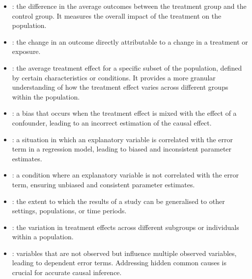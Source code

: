 \documentclass[letterpaper,10pt,english]{jupyterBook}
\begin{document}
\label{\detokenize{notebooks/glossary:effects-and-estimates}}\begin{itemize}
\item {} 
\sphinxAtStartPar
{}: the difference in the average outcomes between the treatment group and the control group. It measures the overall impact of the treatment on the population.

\item {} 
\sphinxAtStartPar
{}: the change in an outcome directly attributable to a change in a treatment or exposure.

\item {} 
\sphinxAtStartPar
{}: the average treatment effect for a specific subset of the population, defined by certain characteristics or conditions. It provides a more granular understanding of how the treatment effect varies across different groups within the population.

\item {} 
\sphinxAtStartPar
{}: a bias that occurs when the treatment effect is mixed with the effect of a confounder, leading to an incorrect estimation of the causal effect.

\item {} 
\sphinxAtStartPar
{}: a situation in which an explanatory variable is correlated with the error term in a regression model, leading to biased and inconsistent parameter estimates.

\item {} 
\sphinxAtStartPar
{}: a condition where an explanatory variable is not correlated with the error term, ensuring unbiased and consistent parameter estimates.

\item {} 
\sphinxAtStartPar
{}: the extent to which the results of a study can be generalised to other settings, populations, or time periods.

\item {} 
\sphinxAtStartPar
{}: the variation in treatment effects across different subgroups or individuals within a population.

\item {} 
\sphinxAtStartPar
{}: variables that are not observed but influence multiple observed variables, leading to dependent error terms. Addressing hidden common causes is crucial for accurate causal inference.


\end{itemize}
\end{document}
